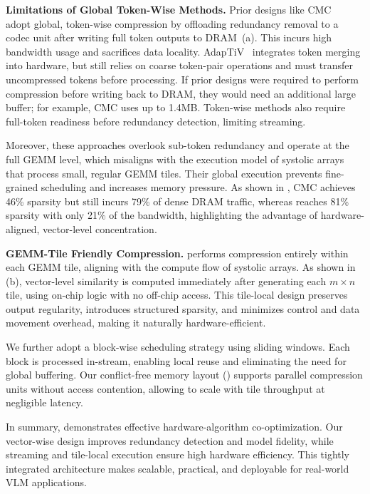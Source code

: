 \textbf{Limitations of Global Token-Wise Methods.}  
Prior designs like CMC~\cite{song2024cmc} adopt global, token-wise compression by offloading redundancy removal to a codec unit after writing full token outputs to DRAM~(a).  
This incurs high bandwidth usage and sacrifices data locality.  
AdapTiV~\cite{yoo2024adaptiv} integrates token merging into hardware, but still relies on coarse token-pair operations and must transfer uncompressed tokens before processing.
{If prior designs were required to perform compression before writing back to DRAM, they would need an additional large buffer; for example, CMC uses up to 1.4MB.}
Token-wise methods also require full-token readiness before redundancy detection, limiting streaming.

Moreover, these approaches overlook sub-token redundancy and operate at the full GEMM level, which misaligns with the execution model of systolic arrays that process small, regular GEMM tiles.
Their global execution prevents fine-grained scheduling and increases memory pressure.  
As shown in , CMC achieves 46\% sparsity but still incurs 79\% of dense DRAM traffic, whereas \proj{} reaches 81\% sparsity with only 21\% of the bandwidth, highlighting the advantage of hardware-aligned, vector-level concentration.


\textbf{GEMM-Tile Friendly Compression.}  
\proj{} performs compression entirely within each GEMM tile, aligning with the compute flow of systolic arrays.  
As shown in (b), vector-level similarity is computed immediately after generating each $m \times n$ tile, using on-chip logic with no off-chip access.
This tile-local design preserves output regularity, introduces structured sparsity, and minimizes control and data movement overhead, making it naturally hardware-efficient.

We further adopt a block-wise scheduling strategy using sliding windows.  
Each block is processed in-stream, enabling local reuse and eliminating the need for global buffering.  
Our conflict-free memory layout () supports parallel compression units without access contention, allowing \proj{} to scale with tile throughput at negligible latency.

In summary, \proj{} demonstrates effective {hardware-algorithm} co-optimization. 
Our vector-wise design improves redundancy detection and model fidelity, while streaming and tile-local execution ensure high hardware efficiency. 
This tightly integrated architecture makes \proj{} scalable, practical, and deployable for real-world VLM applications.

